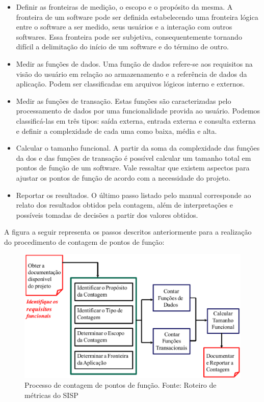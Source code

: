 \begin{itemize}

\item Definir as fronteiras de medição, o escopo e o propósito da mesma. A fronteira de um software pode ser definida estabelecendo uma fronteira lógica entre o software a ser medido, seus usuários e a interação com outros softwares. Essa fronteira pode ser subjetiva, consequentemente tornando difícil a delimitação do início de um software e do término de outro.

\item Medir as funções de dados. Uma função de dados refere-se aos requisitos na visão do usuário em relação ao armazenamento e a referência de dados da aplicação. Podem ser classificadas em arquivos lógicos interno e externos.

\item Medir as funções de transação. Estas funções são caracterizadas pelo processamento de dados por uma funcionalidade provida ao usuário. Podemos classificá-las em três tipos: saída externa, entrada externa e consulta externa e definir a complexidade de cada uma como baixa, média e alta.

\item Calcular o tamanho funcional. A partir da soma da complexidade das funções da dos e das funções de transação é possível calcular um tamanho total em pontos de função de um software. Vale ressaltar que existem aspectos para ajustar os pontos de função de acordo com a necessidade do projeto.

\item Reportar os resultados. O último passo listado pelo manual corresponde ao relato dos resultados obtidos pela contagem, além de interpretações e possíveis tomadas de decisões a partir dos valores obtidos.

\end{itemize}

A figura a seguir representa os passos descritos anteriormente para a realização do procedimento de contagem de pontos de função:

\begin{figure}[h]
	\centering
	\label{fig01}
		\includegraphics[keepaspectratio=true,scale=0.4]{figuras/fig01.eps}
	\caption{Processo de contagem de pontos de função. Fonte: Roteiro de métricas do SISP}
\end{figure}


